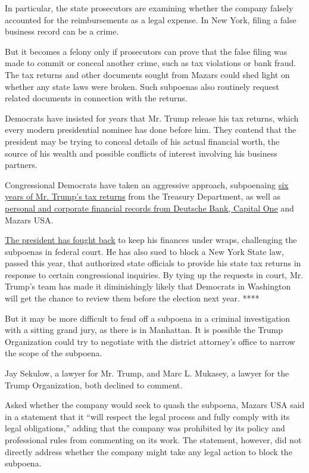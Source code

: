 In particular, the state prosecutors are examining whether the company
falsely accounted for the reimbursements as a legal expense. In New
York, filing a false business record can be a crime.

But it becomes a felony only if prosecutors can prove that the false
filing was made to commit or conceal another crime, such as tax
violations or bank fraud. The tax returns and other documents sought
from Mazars could shed light on whether any state laws were broken. Such
subpoenas also routinely request related documents in connection with
the returns.

Democrats have insisted for years that Mr. Trump release his tax
returns, which every modern presidential nominee has done before him.
They contend that the president may be trying to conceal details of his
actual financial worth, the source of his wealth and possible conflicts
of interest involving his business partners.

Congressional Democrats have taken an aggressive approach, subpoenaing
\href{https://www.nytimes.com/2019/04/03/us/politics/mueller-report-subpoena-house.html}{six
years of Mr. Trump's tax returns} from the Treasury Department, as well
as
\href{https://www.nytimes.com/2019/05/22/business/deutsche-bank-trump-subpoena.html}{personal
and corporate financial records from Deutsche Bank, Capital One} and
Mazars USA.

\href{https://www.nytimes.com/2019/08/13/us/politics/trump-house-lawsuits.html}{The
president has fought back} to keep his finances under wraps, challenging
the subpoenas in federal court. He has also sued to block a New York
State law, passed this year, that authorized state officials to provide
his state tax returns in response to certain congressional inquiries. By
tying up the requests in court, Mr. Trump's team has made it
diminishingly likely that Democrats in Washington will get the chance to
review them before the election next year. ****

But it may be more difficult to fend off a subpoena in a criminal
investigation with a sitting grand jury, as there is in Manhattan. It is
possible the Trump Organization could try to negotiate with the district
attorney's office to narrow the scope of the subpoena.

Jay Sekulow, a lawyer for Mr. Trump, and Marc L. Mukasey, a lawyer for
the Trump Organization, both declined to comment.

Asked whether the company would seek to quash the subpoena, Mazars USA
said in a statement that it ``will respect the legal process and fully
comply with its legal obligations,'' adding that the company was
prohibited by its policy and professional rules from commenting on its
work. The statement, however, did not directly address whether the
company might take any legal action to block the subpoena.

